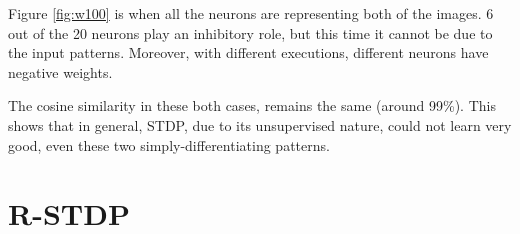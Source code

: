 \documentclass{article}
\begin{document}
	Figure \ref{fig:w100} is when all the neurons are representing both of the images. 6 out of the 20 neurons play an inhibitory role, but this time it cannot be due to the input patterns. Moreover, with different executions, different neurons have negative weights.
	
	The cosine similarity in these both cases, remains the same (around 99\%). This shows that in general, STDP, due to its unsupervised nature, could not learn very good, even these two simply-differentiating patterns.
	
	\section{R-STDP}
	
\end{document}
